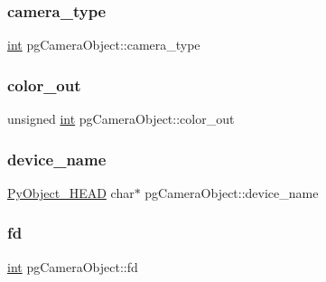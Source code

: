 \subsubsection{\texorpdfstring{camera\_type}{camera\_type}}
{\footnotesize\ttfamily \mbox{\hyperlink{warnings_8h_a74f207b5aa4ba51c3a2ad59b219a423b}{int}} pg\+Camera\+Object\+::camera\+\_\+type}

\mbox{\label{structpg_camera_object_a2775612fd5cbf0b354b38965fc54633e}} 
\subsubsection{\texorpdfstring{color\_out}{color\_out}}
{\footnotesize\ttfamily unsigned \mbox{\hyperlink{warnings_8h_a74f207b5aa4ba51c3a2ad59b219a423b}{int}} pg\+Camera\+Object\+::color\+\_\+out}

\mbox{\label{structpg_camera_object_a764be1196a56703f31cfa7291a8cccbb}} 
\subsubsection{\texorpdfstring{device\_name}{device\_name}}
{\footnotesize\ttfamily \mbox{\hyperlink{_python27_2object_8h_a0bf35c1f3ea13f925de94d8593db3b7e}{Py\+Object\+\_\+\+H\+E\+AD}} char$\ast$ pg\+Camera\+Object\+::device\+\_\+name}

\mbox{\label{structpg_camera_object_ae94b469ef0f316a7c9d534874cd836ba}} 
\subsubsection{\texorpdfstring{fd}{fd}}
{\footnotesize\ttfamily \mbox{\hyperlink{warnings_8h_a74f207b5aa4ba51c3a2ad59b219a423b}{int}} pg\+Camera\+Object\+::fd}

\mbox{\label{structpg_camera_object_a9771d6c042288e7d1952e44c5532171f}} 
